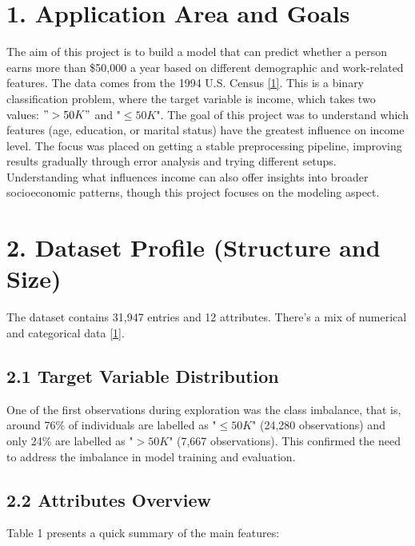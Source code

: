 \documentclass[a4paper,oneside,bibliography=totoc]{scrbook}
\begin{document}
\section*{1. Application Area and Goals}
\label{ch:intro}

The aim of this project is to build a model that can predict whether a person earns more than \$50,000 a year based on different demographic and work-related features. The data comes from the 1994 U.S. Census \href{https://www.kaggle.com/datasets/anaghakp/adult-income-census}{[1]}.
This is a binary classification problem, where the target variable is income, which takes two values: $">50K"$ and "$\leq50K$". The goal of this project was to understand which features (age, education, or marital status) have the greatest influence on income level. The focus was placed on getting a stable preprocessing pipeline, improving results gradually through error analysis and trying different setups.
Understanding what influences income can also offer insights into broader socioeconomic patterns, though this project focuses on the modeling aspect.



\section*{2. Dataset Profile (Structure and Size)}

The dataset contains 31,947 entries and 12 attributes. There’s a mix of numerical and categorical data \href{https://www.kaggle.com/datasets/anaghakp/adult-income-census}{[1]}.
\subsection*{2.1 Target Variable Distribution}
One of the first observations during exploration was the class imbalance, that is, around 76\% of individuals are labelled as "$\leq50K$" (24,280 observations) and only 24\% are labelled as "$>50K$" (7,667 observations). This confirmed the need to address the imbalance in model training and evaluation.

\subsection*{2.2 Attributes Overview}
Table 1 presents a quick summary of the main features:
\end{document}
